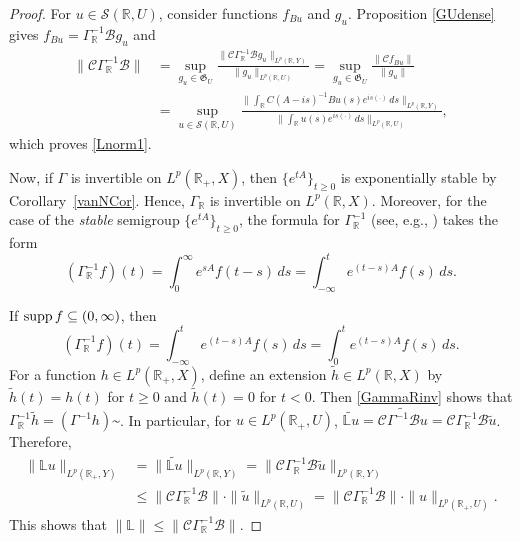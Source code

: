\documentclass[10pt,psamsfonts,leqno]{siamltex}
\newcommand{\bbR}{\mathbb{R}}
\newcommand{\bbL}{\mathbb{L}}
\newcommand{\calB}{\mathcal{B}}
\newcommand{\calC}{\mathcal{C}}
\newcommand{\calS}{\mathcal{S}}
\newcommand{\scrG}{\mathfrak{G}}
\newcommand{\lb}{\label}
\newcommand{\LpR}{{L^p(\bbR,X)}}
\newcommand{\LpRX}{{L^p(\bbR_+,X)}}
\newcommand{\LpRU}{{L^p(\bbR_+,U)}}
\newcommand{\LpRY}{{L^p(\bbR_+,Y)}}
\begin{document}
\begin{proof}
For $u\in \calS(\bbR,U)$, consider functions $f_{Bu}$ and $g_u$.
Proposition \ref{GUdense} gives $f_{Bu}=\Gamma^{-1}_\bbR \calB g_u$ and
\begin{align*}
\| \calC \Gamma^{-1}_\bbR \calB \|
 &= \sup_{g_u\in \scrG_U}
\frac{\| \calC \Gamma^{-1}_\bbR \calB g_u \|_{L^p(\bbR,Y)}}
    {\| g_u  \|_{L^p(\bbR,U)}}
=\sup_{g_u\in \scrG_U}\frac{\|\calC f_{Bu}\|}{\| g_u  \|}\\
&=\sup_{u\in \calS(\bbR, U)}
\frac{\| \int_\bbR C(A-is)^{-1}Bu(s)e^{is(\cdot)}\,ds
\|_{L^p(\bbR,Y)}} {\|\int_\bbR u(s)e^{is(\cdot)}\,ds\| _{L^p(\bbR,U)}},
\end{align*}
which proves \eqref{Lnorm1}.

Now, if $\Gamma$ is invertible on $\LpRX$, then $\{e^{tA} \}_{t\ge 0}$
is
exponentially stable by Corollary~\ref{vanNCor}.
Hence, $\Gamma_\bbR$ is invertible on $\LpR$. Moreover,
for the case of the {\it stable} semigroup $\{e^{tA}\}_{t\ge 0}$,
the formula for $\Gamma_\bbR^{-1}$ (see, e.g., \cite{LaRa})
takes the form
\begin{equation*}
(\Gamma_\bbR^{-1}f)(t)
=\int_0^\infty e^{sA}f(t-s)\, ds
=\int_{-\infty}^t e^{(t-s)A}f(s)\, ds.
\end{equation*}

If $\supp f \subseteq (0,\infty)$, then
\begin{equation}\lb{GammaRinv}
(\Gamma_\bbR^{-1}f)(t)=\int_{-\infty}^t e^{(t-s)A}f(s)\, ds = \int_0^t
e^{(t-s)A}f(s)\, ds.
\end{equation}
For a function $h\in \LpRX$, define an extension $\tilde{h} \in \LpR$ by
$\tilde{h}(t) =
h(t)$ for $t\ge 0$ and $\tilde{h}(t)=0$ for $t<0$.
Then \eqref{GammaRinv} shows that $\Gamma_\bbR^{-1}\tilde{h}
=(\Gamma^{-1}h)\sptilde$. In particular, for $u\in \LpRU$,
$\widetilde{\bbL u}= \widetilde{\calC \Gamma^{-1}\calB u}=
\calC \Gamma_\bbR^{-1} \calB \tilde{u}$.
Therefore,
\begin{align*}
\| \bbL u \| _{\LpRY}
&= \| \widetilde{\bbL u}  \|_{L^p(\bbR,Y)}= \|
\calC \Gamma_\bbR^{-1}\calB \tilde{u}\|_{L^p(\bbR,Y)}\\
&\le \| \calC \Gamma_\bbR ^{-1} \calB \| \cdot
\|\tilde{u}\|_{L^p(\bbR,U)}=\| \calC \Gamma_\bbR ^{-1} \calB \|\cdot
\|u\|_{\LpRU}.
\end{align*}
This shows that $\| \bbL \| \le \| \calC \Gamma_\bbR ^{-1} \calB \|$.


\end{proof}
\end{document}
